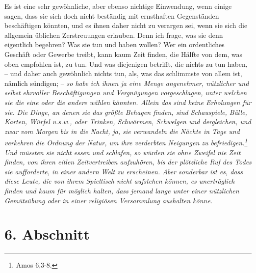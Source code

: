 \medskip

Es ist eine sehr gewöhnliche, aber ebenso nichtige Einwendung, wenn einige
sagen, dass sie sich doch nicht beständig mit ernsthaften Gegenständen
beschäftigen könnten, und es ihnen daher nicht zu verargen sei, wenn sie sich
die allgemein üblichen Zerstreuungen erlauben. Denn ich frage, was sie denn
eigentlich begehren? Was sie tun und haben wollen? Wer ein ordentliches
Geschäft oder Gewerbe treibt, kann kaum Zeit finden, die Hälfte von dem, was
oben empfohlen ist, zu tun. Und was diejenigen betrifft, die nichts zu tun
haben, -- und daher auch gewöhnlich nichts tun, als, was das schlimmste von
allem ist, nämlich sündigen; -- \textit{so habe ich ihnen ja eine Menge
angenehmer,
nützlicher und selbst ehrvoller Beschäftigungen und Vergnügungen
vorgeschlagen, unter welchen sie die eine oder die andere wählen könnten. Allein
das
sind keine Erholungen für sie. Die Dinge, an denen sie das größte Behagen
finden, sind Schauspiele, Bälle, Karten, Würfel u.s.w., oder Trinken,
Schwärmen, Schwelgen und dergleichen, und zwar vom Morgen bis
in die Nacht, ja,
sie verwandeln die Nächte in Tage und verkehren die Ordnung der Natur, um ihre
verderbten Neigungen zu befriedigen.\footnote{Amos 6,3-8.}
Und müssten sie nicht
essen und schlafen, so würden sie ohne Zweifel nie Zeit finden, von ihren eitlen
Zeitvertreiben aufzuhören, bis der plötzliche Ruf des Todes sie aufforderte, in
einer andern Welt zu erscheinen. Aber sonderbar ist es, dass diese Leute, die
von
ihrem Spieltisch nicht aufstehen können, es unerträglich finden und kaum für
möglich halten, dass jemand lange unter einer nützlichen Gemütsübung oder in
einer religiösen Versammlung aushalten könne.}

\section{6. Abschnitt} \label{kap15_ab6}

